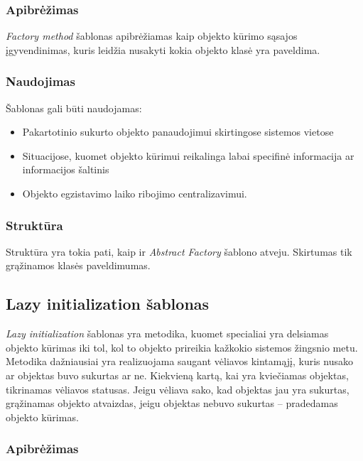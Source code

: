 \documentclass[10pt]{IEEEtran}
\begin{document}
			\subsubsection{Apibrėžimas}

				\textit{Factory method} šablonas apibrėžiamas kaip objekto kūrimo sąsajos įgyvendinimas, kuris leidžia nusakyti kokia objekto klasė yra paveldima.

			\subsubsection{Naudojimas}

				Šablonas gali būti naudojamas:
				\begin{itemize}
					\item Pakartotinio sukurto objekto panaudojimui skirtingose sistemos vietose
					\item Situacijose, kuomet objekto kūrimui reikalinga labai specifinė informacija ar informacijos šaltinis
					\item Objekto egzistavimo laiko ribojimo centralizavimui.
				\end{itemize}

			\subsubsection{Struktūra}

				Struktūra yra tokia pati, kaip ir \textit{Abstract Factory} šablono atveju. Skirtumas tik grąžinamos klasės paveldimumas.

		\subsection{Lazy initialization šablonas}

			\textit{Lazy initialization} šablonas yra metodika, kuomet specialiai yra delsiamas objekto kūrimas iki tol, kol to objekto prireikia kažkokio sistemos žingsnio metu. Metodika dažniausiai yra realizuojama saugant vėliavos kintamąjį, kuris nusako ar objektas buvo sukurtas ar ne. Kiekvieną kartą, kai yra kviečiamas objektas, tikrinamas vėliavos statusas. Jeigu vėliava sako, kad objektas jau yra sukurtas, grąžinamas objekto atvaizdas, jeigu objektas nebuvo sukurtas -- pradedamas objekto kūrimas.

			\subsubsection{Apibrėžimas}
\end{document}
